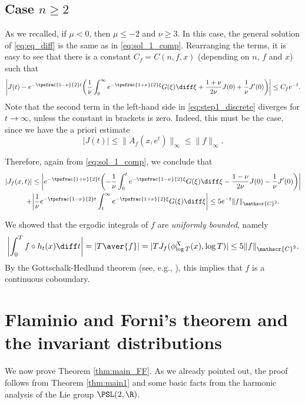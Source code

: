 \subsection{Case $n\geq 2$}

As we recalled, if $\mu <0$, then $\mu \leq -2$ and $\nu \geq 3$.
In this case, the general solution of \eqref{eq:eq_diff} is the same as in \eqref{eq:sol_1_comp}.
Rearranging the terms, it is easy to see that there is a constant $C_f= C(n,f,x)$ (depending on $n$, $f$ and $x$) such that
\begin{equation}\label{eq:step1_discrete}
\biggl\lvert J(t) - e^{-\tpsfrac{1-\nu}{2}t} \biggl(\frac{1}{\nu} \int_0^{\infty} e^{-\tpsfrac{1+\nu}{2}\xi} G(\xi) \diff \xi + \frac{1+\nu}{2\nu} J(0) + \frac{1}{\nu}J'(0) \biggr) \biggr\rvert \leq C_f e^{-t}.
\end{equation}
Note that the second term in the left-hand side in \eqref{eq:step1_discrete} diverges for $t \to \infty$, unless the constant in brackets is zero.
Indeed, this must be the case, since we have the a priori estimate
\[
|J(t)|\leq \|A_f(x,e^t) \|_\infty \leq \|f\|_\infty.
\]

Therefore, again from \eqref{eq:sol_1_comp}, we conclude that
\begin{multline}\label{eq:estimate_discrete}
|J_{f}(x,t)|\leq \biggl\lvert e^{-\tpsfrac{1+\nu}{2}t} \biggl(- \frac{1}{\nu} \int_0^t e^{-\tpsfrac{1-\nu}{2}\xi} G(\xi) \diff \xi - \frac{1-\nu}{2\nu} J(0) - \frac{1}{\nu}J'(0) \biggr) \biggr\rvert \\
+ \biggl\lvert \frac{1}{\nu} e^{-\tpsfrac{1-\nu}{2}t} \int_t^{\infty} e^{-\tpsfrac{1+\nu}{2}\xi} G(\xi) \diff \xi \biggr\rvert
\leq 5e^{-t}\|f\|_{\mathscr{C}^2}.
\end{multline}

We showed that the ergodic integrals of $f$ are \emph{uniformly bounded}, namely
\[
\biggl\lvert \int_0^T f \circ h_t (x) \diff t \biggr\rvert = |T \aver{f}|= |T J_{f}(\phi^X_{\log T}(x), \log T)|\leq 5\|f\|_{\mathscr{C}^2}.
\]
By the Gottschalk-Hedlund theorem (see, e.g., \cite[Th.\,C]{McC}), this implies that $f$ is a continuous coboundary.

\section{Flaminio and Forni's theorem and the invariant distributions}\label{section:FF}

We now prove Theorem \ref{thm:main_FF}. As we already pointed out, the proof follows from Theorem \ref{thm:main1} and some basic facts from the harmonic analysis of the Lie group $\PSL(2,\R)$.


